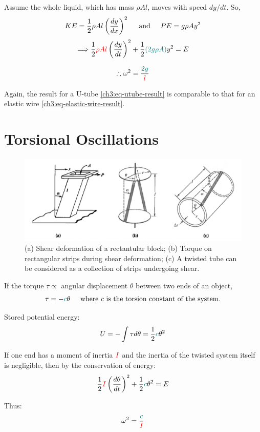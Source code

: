 Assume the whole liquid, which has mass $\rho Al$, moves with speed $dy/dt$. So,
\[ KE = \frac{1}{2} \rho Al \left(\frac{dy}{dx}\right)^2 \hspace{0.5cm}\text{and}\hspace{0.5cm}
PE = g\rho Ay^2 \]
\[ \Longrightarrow \frac{1}{2} \textcolor{red}{\rho Al} \left( \frac{dy}{dt} \right)^2 
+ \frac{1}{2} \textcolor{teal}{(2g\rho A)} y^2 = E  \] 

\begin{equation}
\therefore \omega^2 = \frac{\textcolor{teal}{2g}}{\textcolor{red}{l}} \label{ch3:eq-utube-result}
\end{equation}

Again, the result for a U-tube \eqref{ch3:eq-utube-result} is comparable to that for an elastic wire \eqref{ch3:eq-elastic-wire-result}.

\section{Torsional Oscillations} \label{ch3:sec-torsional}

\begin{figure}
	\centering
	\includegraphics[scale=0.55]{phys232/Ch3-shear-torsion.png}
	\caption{(a) Shear deformation of a rectantular block; (b) Torque on rectangular strips during shear deformation; (c) A twisted tube can be considered as a collection of strips undergoing shear.}
	\label{ch3:fig-shear-torsion}
\end{figure}

If the torque $\tau \propto$ angular displacement $\theta$ between two ends of an object,
\[ \tau=-\textcolor{teal}{c}\theta \hspace{0.5cm}\text{where }\text{$c$ is the torsion constant of the system.} \]

Stored potential energy: \[ U= -\int \tau d\theta = \frac{1}{2} \textcolor{teal}{c}\theta^2 \]

If one end has a moment of inertia $\textcolor{red}{I}$ and the inertia of the twisted system itself is negligible, then by the conservation of energy:
\[ \frac{1}{2} \textcolor{red}{I} \left( \frac{d\theta}{dt}\right)^2 + \frac{1}{2} \textcolor{teal}{c}\theta^2 = E \]

Thus:
\begin{equation*}
\omega^2 = \frac{\textcolor{teal}{c}}{\textcolor{red}{I}}
\end{equation*}

